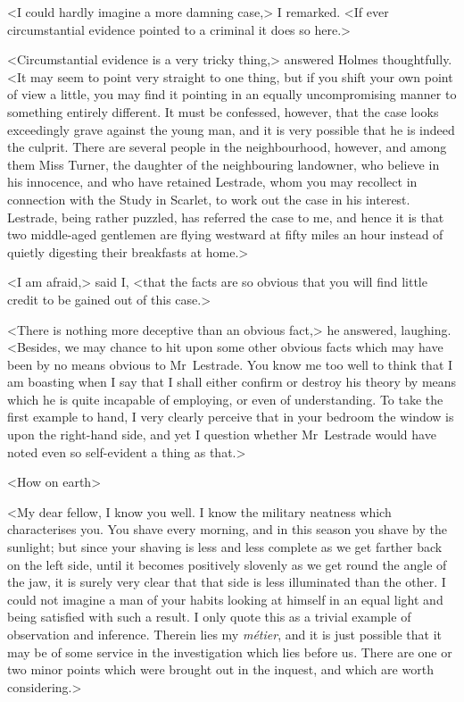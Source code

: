 <I could hardly imagine a more damning case,> I remarked. <If ever circumstantial evidence pointed to a criminal it does so here.>

<Circumstantial evidence is a very tricky thing,> answered Holmes thoughtfully. <It may seem to point very straight to one thing, but if you shift your own point of view a little, you may find it pointing in an equally uncompromising manner to something entirely different. It must be confessed, however, that the case looks exceedingly grave against the young man, and it is very possible that he is indeed the culprit. There are several people in the neighbourhood, however, and among them Miss Turner, the daughter of the neighbouring landowner, who believe in his innocence, and who have retained Lestrade, whom you may recollect in connection with the Study in Scarlet, to work out the case in his interest. Lestrade, being rather puzzled, has referred the case to me, and hence it is that two middle-aged gentlemen are flying westward at fifty miles an hour instead of quietly digesting their breakfasts at home.>

<I am afraid,> said I, <that the facts are so obvious that you will find little credit to be gained out of this case.>

<There is nothing more deceptive than an obvious fact,> he answered, laughing. <Besides, we may chance to hit upon some other obvious facts which may have been by no means obvious to Mr~Lestrade. You know me too well to think that I am boasting when I say that I shall either confirm or destroy his theory by means which he is quite incapable of employing, or even of understanding. To take the first example to hand, I very clearly perceive that in your bedroom the window is upon the right-hand side, and yet I question whether Mr~Lestrade would have noted even so self-evident a thing as that.>

<How on earth\longdash>

<My dear fellow, I know you well. I know the military neatness which characterises you. You shave every morning, and in this season you shave by the sunlight; but since your shaving is less and less complete as we get farther back on the left side, until it becomes positively slovenly as we get round the angle of the jaw, it is surely very clear that that side is less illuminated than the other. I could not imagine a man of your habits looking at himself in an equal light and being satisfied with such a result. I only quote this as a trivial example of observation and inference. Therein lies my \textit{métier}, and it is just possible that it may be of some service in the investigation which lies before us. There are one or two minor points which were brought out in the inquest, and which are worth considering.>

